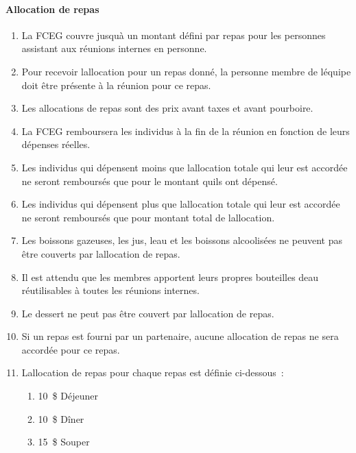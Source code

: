 \paragraph{Allocation de repas}
\begin{enumerate}
 \item
  La FCEG couvre jusqu\textquotesingle à un montant défini par repas pour les personnes assistant aux réunions internes en personne.
 \item
  Pour recevoir l\textquotesingle allocation pour un repas donné, la personne membre de l\textquotesingle équipe doit être présente à la réunion pour ce repas.
 \item
  Les allocations de repas sont des prix avant taxes et avant pourboire.
 \item
  La FCEG remboursera les individus à la fin de la réunion en fonction de leurs dépenses réelles.
 \item
  Les individus qui dépensent moins que l\textquotesingle allocation totale qui leur est accordée ne seront remboursés que pour le montant qu\textquotesingle ils ont dépensé.
 \item
  Les individus qui dépensent plus que l\textquotesingle allocation totale qui leur est accordée ne seront remboursés que pour montant total de l\textquotesingle allocation.
 \item
  Les boissons gazeuses, les jus, l\textquotesingle eau et les boissons alcoolisées ne peuvent pas être couverts par l\textquotesingle allocation de repas.
 \item
  Il est attendu que les membres apportent leurs propres bouteilles d\textquotesingle eau réutilisables à toutes les réunions internes.
 \item
  Le dessert ne peut pas être couvert par l\textquotesingle allocation de repas.
 \item
  Si un repas est fourni par un partenaire, aucune allocation de repas ne sera accordée pour ce repas.
 \item
  L\textquotesingle allocation de repas pour chaque repas est définie ci-dessous~:

  \begin{enumerate}
   \item
    10~\$ Déjeuner
   \item
    10~\$ Dîner
   \item
    15~\$ Souper
  \end{enumerate}

\end{enumerate}

